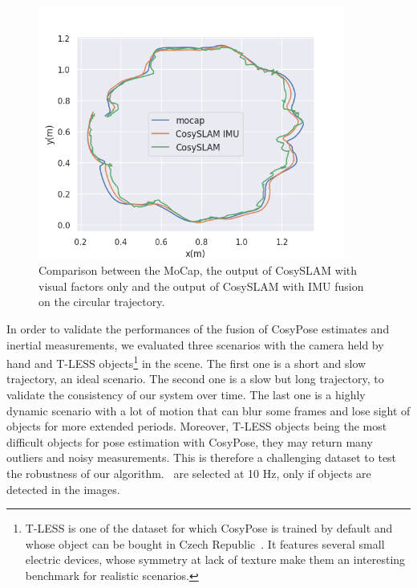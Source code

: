 \begin{figure}[h]
  \centering
  \includegraphics[width=0.9\textwidth]{figures/cosyslam/trajectory_circular.png}
  \caption{Comparison between the MoCap, the output of CosySLAM with visual factors only and the output of CosySLAM with IMU fusion on the circular trajectory.}
  \label{fig:traj_circular}
\end{figure}

In order to validate the performances of the fusion of CosyPose estimates and inertial measurements, we evaluated three scenarios with the camera held by hand and 
T-LESS objects\footnote{T-LESS is one of the dataset for which CosyPose is trained by default and whose object can be bought in Czech Republic~\cite{hodan17t}. 
It features several small electric devices, whose symmetry at lack of texture make them an interesting benchmark for realistic scenarios.} in the scene. 
The first one is a short and slow trajectory, \ie an ideal scenario. The second one is a slow but long trajectory, to validate the consistency of our system over time. 
The last one is a highly dynamic scenario with a lot of motion that can blur some frames and lose sight of objects for more extended periods. 
Moreover, T-LESS objects being the most difficult objects for pose estimation with CosyPose, they may return many outliers and noisy measurements. 
This is therefore a challenging dataset to test the robustness of our algorithm. \Keyframes\ are selected at 10 Hz, only if objects are detected in the images.

